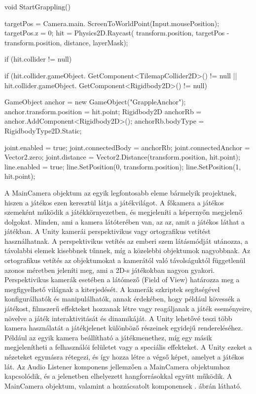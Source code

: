 \begin{java}
void StartGrappling()
{
    targetPos = 
        Camera.main.
        ScreenToWorldPoint(Input.mousePosition);
    targetPos.z = 0;
    hit = 
        Physics2D.Raycast(
            transform.position, 
            targetPos - transform.position, 
            distance, layerMask);

    if (hit.collider != null)
    {
        if (hit.collider.gameObject.
            GetComponent<TilemapCollider2D>() != null || 
            hit.collider.gameObject.
            GetComponent<Rigidbody2D>() != null)
        {
            GameObject anchor = 
                new GameObject("GrappleAnchor");
            anchor.transform.position = hit.point;
            Rigidbody2D anchorRb = 
                anchor.AddComponent<Rigidbody2D>();
            anchorRb.bodyType = 
                RigidbodyType2D.Static;

            joint.enabled = true;
            joint.connectedBody = anchorRb;
            joint.connectedAnchor = Vector2.zero;
            joint.distance = 
                Vector2.Distance(transform.position, 
                hit.point);
            line.enabled = true;
            line.SetPosition(0, transform.position);
            line.SetPosition(1, hit.point);
        }
    }
}
\end{java}


A MainCamera objektum az egyik legfontosabb eleme bármelyik projektnek, hiszen a játékos ezen keresztül látja a játékvilágot. A főkamera a játékos szemeként működik a játékkörnyezetben, és megjeleníti a képernyőn megjelenő dolgokat. Minden, ami a kamera látóterében van, az az, amit a játékos láthat a játékban. A Unity kamerái perspektivikus vagy ortografikus vetítést használhatnak. A perspektivikus vetítés az emberi szem látásmódját utánozza, a távolabbi elemek kisebbnek tűnnek, míg a közelebbi objektumok nagyobbnak. Az ortografikus vetítés az objektumokat a kamerától való távolságuktól függetlenül azonos méretben jeleníti meg, ami a 2D-s játékokban nagyon gyakori. Perspektivikus kamerák esetében a látómező (Field of View) határozza meg a megfigyelhető világnak a kiterjedését. A kamerák szkriptek segítségével konfigurálhatók és manipulálhatók, annak érdekében, hogy például kövessék a játékost, filmszerű effekteket hozzanak létre vagy reagáljanak a játék eseményeire, növelve a játék interaktivitását és dinamikáját. A Unity lehetővé teszi több kamera használatát a játékjelenet különböző részeinek egyidejű rendereléséhez. Például az egyik kamera beállítható a játékmenethez, míg egy másik megjelenítheti a felhasználói felületet vagy a speciális effekteket. A Unity ezeket a nézeteket egymásra rétegezi, és így hozza létre a végső képet, amelyet a játékos lát. Az Audio Listener komponens jellemzően a MainCamera objektumhoz kapcsolódik, és a jelenetben elhelyezett hangforrásokkal együtt működik.\cite{cameracomponent} A MainCamera objektum, valamint a hozzácsatolt komponensek . ábrán látható.

